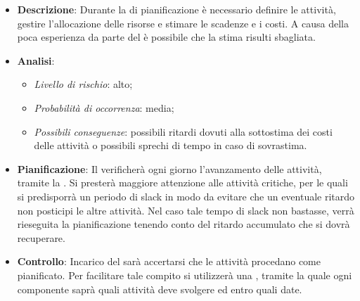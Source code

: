 			\begin{itemize}
				\item \textbf{Descrizione}: Durante la  di pianificazione è necessario definire le attività, gestire l'allocazione delle risorse e stimare le scadenze e i costi. A causa della poca esperienza da parte del  è possibile che la stima risulti sbagliata.
				\item \textbf{Analisi}:
				\begin{itemize}
					\item \textit{Livello di rischio}: alto;
					\item \textit{Probabilità di occorrenza}: media;
					\item \textit{Possibili conseguenze}: possibili ritardi dovuti alla sottostima dei costi delle attività o possibili sprechi di tempo in caso di sovrastima. 
				\end{itemize}
				\item \textbf{Pianificazione}: Il  verificherà ogni giorno l'avanzamento delle attività, tramite la \textit{}. Si presterà maggiore attenzione alle attività critiche, per le quali si predisporrà un periodo di slack in modo da evitare che un eventuale ritardo non posticipi le altre attività. Nel caso tale tempo di slack non bastasse, verrà rieseguita la pianificazione tenendo conto del ritardo accumulato che si dovrà recuperare.
				\item \textbf{Controllo}: Incarico del  sarà accertarsi che le attività procedano come pianificato. Per facilitare tale compito si utilizzerà una \textit{}, tramite la quale ogni componente saprà quali attività deve svolgere ed entro quali date.

\end{itemize}
